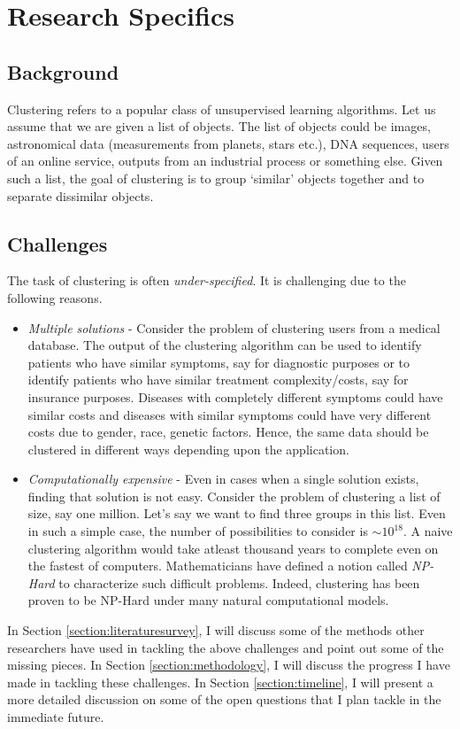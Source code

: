 \documentclass[11pt]{article}
\begin{document}
\section{Research Specifics}
\subsection{Background}
Clustering refers to a popular class of unsupervised learning algorithms. Let us assume that we are given a list of objects. The list of objects could be images, astronomical data (measurements from planets, stars etc.), DNA sequences, users of an online service, outputs from an industrial process or something else. Given such a list, the goal of clustering is to group `similar' objects together and to separate dissimilar objects.

\subsection{Challenges}
The task of clustering is often \textit{under-specified}. It is challenging due to the following reasons.
\begin{itemize}
\item \textit{Multiple solutions} - Consider the problem of clustering users from a medical database. The output of the clustering algorithm can be used to identify patients who have similar symptoms, say for diagnostic purposes or to identify patients who have similar treatment complexity/costs, say for insurance purposes. Diseases with completely different symptoms could have similar costs and diseases with similar symptoms could have very different costs due to gender, race, genetic factors.  Hence, the same data should be clustered in different ways depending upon the application. 
\item \textit{Computationally expensive} - Even in cases when a single solution exists, finding that solution is not easy. Consider the problem of clustering a list of size, say one million. Let's say we want to find three groups in this list. Even in such a simple case, the number of possibilities to consider is $\sim 10^{18}$. A naive clustering algorithm would take atleast thousand years to complete even on the fastest of computers. Mathematicians have defined a notion called \textit{NP-Hard} to characterize such difficult problems. Indeed, clustering has been proven to be NP-Hard under many natural computational models.
\end{itemize} 

In Section \ref{section:literaturesurvey}, I will discuss some of the methods other researchers have used in tackling the above challenges and point out some of the missing pieces. In Section \ref{section:methodology}, I will discuss the progress I have made in tackling these challenges. In Section \ref{section:timeline}, I will present a more detailed discussion on some of the open questions that I plan tackle in the immediate future.
\end{document}
